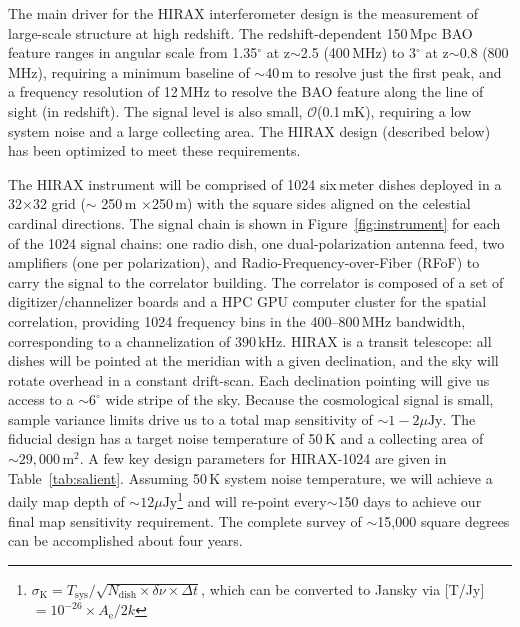 \documentclass[]{spie}  %
\begin{document}
The main driver for the HIRAX interferometer design is the measurement of large-scale structure at high redshift. The redshift-dependent 150\,Mpc BAO feature ranges in angular scale from 1.35$^{\circ}$ at z$\sim$2.5 (400\,MHz) to 3$^{\circ}$ at z$\sim$0.8 (800\,MHz), requiring a minimum baseline of $\sim$40\,m to resolve just the first peak, and a frequency resolution of 12\,MHz to resolve the BAO feature along the line of sight (in redshift). The signal level is also small, $\mathcal{O}$(0.1\,mK), requiring a low system noise and a large collecting area. The HIRAX design (described below) has been optimized to meet these requirements. \newline 

The HIRAX instrument will be comprised of 1024 six\,meter dishes deployed in a 32$\times$32 grid ($\sim$ 250\,m $\times$250\,m) with the square sides aligned on the celestial cardinal directions. The signal chain is shown in Figure~\ref{fig:instrument} for each of the 1024 signal chains: one radio dish, one dual-polarization antenna feed, two amplifiers (one per polarization), and Radio-Frequency-over-Fiber (RFoF) to carry the signal to the correlator building. The correlator is composed of a set of digitizer/channelizer boards and a HPC GPU computer cluster for the spatial correlation, providing 1024 frequency bins in the 400--800\,MHz bandwidth, corresponding to a channelization of 390\,kHz. HIRAX is a transit telescope: all dishes will be pointed at the meridian with a given declination, and the sky will rotate overhead in a constant drift-scan. Each declination pointing will give us access to a $\sim6^{\circ}$ wide stripe of the sky. Because the cosmological signal is small, sample variance limits drive us to a total map sensitivity of $\sim1-2\mu\mathrm{Jy}$. The fiducial design has a target noise temperature of 50\,K and a collecting area of $\sim29,000\,\mathrm{m}^{2}$. A few key design parameters for HIRAX-1024 are given in Table~\ref{tab:salient}. Assuming 50\,K system noise temperature, we will achieve a daily map depth of $\sim12\mu\mathrm{Jy}$\footnote{$\sigma_{\mathrm{K}} = T_{\mathrm{sys}} / \sqrt{N_{\mathrm{dish}} \times \delta\nu \times \Delta t}$, which can be converted to Jansky via [T/Jy]$ = 10^{-26} \times A_{\mathrm{e}} / 2k$} and will re-point every$\sim$150 days to achieve our final map sensitivity requirement. The complete survey of $\sim$15,000 square degrees can be accomplished about four years.
\newline
\end{document}
